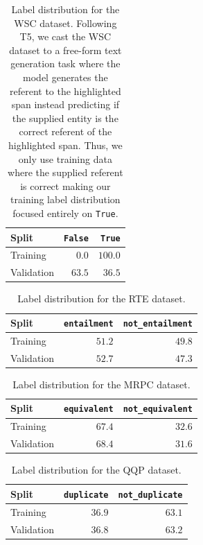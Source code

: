 \documentclass[11pt]{article}
\begin{document}
\begin{table}[t]
    \centering
    \footnotesize
    \begin{tabular}{l | r r}
    \toprule
    Split & {\tt False} & {\tt True} \\
    \midrule
    Training & $0.0$ & $100.0$ \\
    Validation & $63.5$ & $36.5$ \\
    \bottomrule
    \end{tabular}
    \caption{Label distribution for the WSC dataset. Following T5, we cast the WSC dataset to a free-form text generation task where the model generates the referent to the highlighted span instead predicting if the supplied entity is the correct referent of the highlighted span. Thus, we only use training data where the supplied referent is correct making our training label distribution focused entirely on {\tt True}.}
    \label{tab:wsc-label-dist}
\end{table}

\begin{table}[t]
    \centering
    \footnotesize
    \begin{tabular}{l | r r}
    \toprule
    Split & {\small\tt entailment} & {\small\tt not\_entailment} \\
    \midrule
    Training & $51.2$ & $49.8$ \\
    Validation & $52.7$ & $47.3$ \\
    \bottomrule
    \end{tabular}
    \caption{Label distribution for the RTE dataset.}
    \label{tab:rte-label-dist}
\end{table}

\begin{table}[t]
    \centering
    \footnotesize
    \begin{tabular}{l | r r}
    \toprule
    Split & {\small\tt equivalent} & {\small\tt not\_equivalent} \\
    \midrule
    Training & $67.4$ & $32.6$ \\
    Validation & $68.4$ & $31.6$ \\
    \bottomrule
    \end{tabular}
    \caption{Label distribution for the MRPC dataset.}
    \label{tab:mrpc-label-dist}
\end{table}

\begin{table}[t]
    \centering
    \footnotesize
    \begin{tabular}{l | r r}
    \toprule
    Split & {\small\tt duplicate} & {\small\tt not\_duplicate} \\
    \midrule
    Training & $36.9$ & $63.1$ \\
    Validation & $36.8$ & $63.2$ \\
    \bottomrule
    \end{tabular}
    \caption{Label distribution for the QQP dataset.}
    \label{tab:qqp-label-dist}
\end{table}
\end{document}
